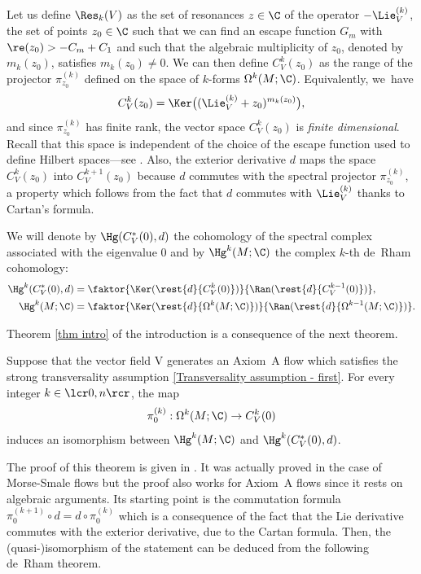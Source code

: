 Let us define $\Res_k (V)$ as the set of resonances $z \in \C$ of the operator $-\Lie_V^{(k)}$, \ie the set of points $z_0\in \C$ such that we can find an escape function $G_m$ with $\re (z_0) > -C_m+C_1$ and such that the algebraic multiplicity of $z_0$, denoted by $m_k (z_0)$, satisfies $m_k (z_0) \neq 0$. We can then define $C_V^k(z_0)$ as the range of the projector $\pi_{z_0}^{(k)}$ defined on the space of $k$-forms $\Omega^k (M;\C)$. Equivalently, we~have
\[
C_V^k (z_0) = \Ker \bigl((\Lie_V^{(k)} + z_0)^{m_k (z_0)} \bigr),
\]
and since $\pi_{z_0}^{(k)}$ has finite rank, the vector space $C_V^k (z_0)$ is \emph{finite dimensional}. Recall that this space is independent of the choice of the escape function used to define Hilbert spaces---see \cite[Th.\,1.5 p.\,334]{FS}. Also, the exterior derivative $d$ maps the space $C_V^k (z_0)$ into $C_V^{k+1} (z_0)$ because $d$ commutes with the spectral projector $\pi_{z_0}^{(k)}$, a property which follows from the fact that $d$ commutes with $\Lie_V^{(k)}$ thanks to Cartan's formula.

We will denote by $\Hg (C_V^* (0),d)$ the cohomology of the spectral complex associated with the eigenvalue $0$ and by $\Hg^k (M; \C)$ the complex $k$-th de~Rham cohomology:
\begin{align*}
\Hg^k (C_V^* (0),d) &= \faktor{ \Ker (\rest{d}{C_V^k (0)}) }{\Ran (\rest{d}{C_V^{k-1} (0)}) }, \\
\Hg^k (M; \C) &= \faktor{\Ker (\rest{d}{\Omega^k (M;\C)}) }{ \Ran (\rest{d}{\Omega^{k-1} (M;\C)})}.
\end{align*}

Theorem \ref{thm intro} of the introduction is a consequence of the next theorem.

\begin{thm}\label{thm isomorphism}
Suppose that the vector field V generates an Axiom~A flow which satisfies the strong transversality assumption \eqref{Transversality assumption - first}. For every integer $k\in\lcr0,n\rcr$, the map
\[
\pi_0^{(k)}: \Omega^k (M ;\C) \to C_V^k (0)
\]
induces an isomorphism between $\Hg^k (M; \C)$ and $\Hg^k (C_V^* (0),d)$.
\end{thm}

The proof of this theorem is given in \cite[Th.\,2.1]{DRIII}. It was actually proved in the case of Morse-Smale flows but the proof also works for Axiom~A flows since it rests on algebraic arguments. Its starting point is the commutation formula $\pi_0^{(k+1)} \circ d = d \circ \pi_0^{(k)}$ which is a consequence of the fact that the Lie derivative commutes with the exterior derivative, due to the Cartan formula. Then, the (quasi-)isomorphism of the statement can be deduced from the following de~Rham theorem.

